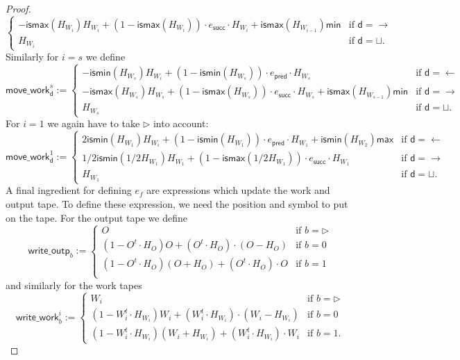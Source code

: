\begin{proof}
$$\begin{cases}
		-\mathsf{ismax}(H_{W_i})H_{W_i} + (1-\mathsf{ismax}(H_{W_i}))\cdot e_{\mathsf{succ}}\cdot H_{W_i} + \mathsf{ismax}(H_{W_{i-1}})\mathsf{min} & \text{if $\mathsf{d}=\rightarrow$}\\
	H_{W_i} & \text{if $\mathsf{d}=\sqcup$}. 	
\end{cases}
$$
Similarly for $i=s$ we define
$$
\mathsf{move\_work}^s_{\mathsf{d}}:=
\begin{cases}
	-\mathsf{ismin}(H_{W_s})H_{W_i} + (1-\mathsf{ismin}(H_{W_s}))\cdot e_{\mathsf{pred}}\cdot H_{W_s}  & \text{if $\mathsf{d}=\leftarrow$}\\
		-\mathsf{ismax}(H_{W_s})H_{W_s} + (1-\mathsf{ismax}(H_{W_s}))\cdot e_{\mathsf{succ}}\cdot H_{W_s} + \mathsf{ismax}(H_{W_{s-1}})\mathsf{min} & \text{if $\mathsf{d}=\rightarrow$}\\
	H_{W_s} & \text{if $\mathsf{d}=\sqcup$}. 	
\end{cases}
$$
For $i=1$ we again have to take $\rhd$ into account:
$$
\mathsf{move\_work}^1_{\mathsf{d}}:=
\begin{cases}
	2\mathsf{ismin}(H_{W_1})H_{W_i} + (1-\mathsf{ismin}(H_{W_1}))\cdot e_{\mathsf{pred}}\cdot H_{W_1} + \mathsf{ismin}(H_{W_{2}})\mathsf{max} & \text{if $\mathsf{d}=\leftarrow$}\\
		1/2\mathsf{ismin}(1/2H_{W_1})H_{W_1} + (1-\mathsf{ismax}(1/2H_{W_1}))\cdot e_{\mathsf{succ}}\cdot H_{W_1}  & \text{if $\mathsf{d}=\rightarrow$}\\
	H_{W_1} & \text{if $\mathsf{d}=\sqcup$}. 	
\end{cases}
$$
A final ingredient for defining $e_f$ are expressions which update the work and output tape.
To define these expression, we need the position and symbol to put on the tape. For the output tape we define
$$
\mathsf{write\_outp}_b:=\begin{cases}
O & \text{if $b=\rhd$}\\
(1-O^t\cdot H_O)O + (O^t\cdot H_O)\cdot (O-H_O) &\text{if $b=0$}\\
(1-O^t\cdot H_O)(O+H_O) + (O^t\cdot H_O)\cdot O &\text{if $b=1$}\\
\end{cases}
$$
and similarly for the work tapes
$$
\mathsf{write\_work}_b^i:=\begin{cases}
W_i & \text{if $b=\rhd$}\\
(1-W_i^t\cdot H_{W_i})W_i + (W_i^t\cdot H_{W_i})\cdot (W_i-H_{W_i}) &\text{if $b=0$}\\
(1-W_i^t\cdot H_{W_i})(W_i+H_{W_i}) + (W_i^t\cdot H_{W_i})\cdot W_i &\text{if $b=1$}.
\end{cases}
$$




\end{proof}
